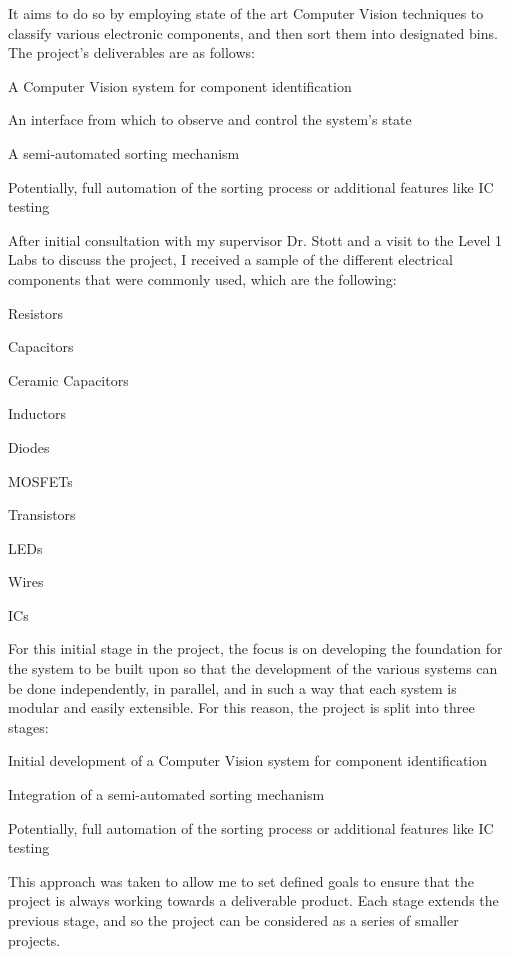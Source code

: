 It aims to do so by employing state of the art Computer Vision techniques to classify various electronic components,
and then sort them into designated bins. The project's deliverables are as follows:
\begin{mylist}
  \item A Computer Vision system for component identification
  \item An interface from which to observe and control the system's state
  \item A semi-automated sorting mechanism
  \item Potentially, full automation of the sorting process or additional features like IC testing
\end{mylist}
\noindent
After initial consultation with my supervisor Dr. Stott and a visit to the Level 1 Labs to discuss the project, I received a sample
of the different electrical components that were commonly used, which are the following:
\begin{multicols}{2}
  \begin{mylist}
    \item Resistors
    \item Capacitors
    \item Ceramic Capacitors
    \item Inductors
    \item Diodes
    \item MOSFETs
    \item Transistors
    \item LEDs
    \item Wires
    \item ICs
  \end{mylist}
\end{multicols}

\noindent
For this initial stage in the project, the focus is on developing the foundation for the system to be built upon so that
the development of the various systems can be done independently, in parallel, and in such a way that each system
is modular and easily extensible. For this reason, the project is split into three stages:
\begin{mylist}
  \item Initial development of a Computer Vision system for component identification
  \item Integration of a semi-automated sorting mechanism
  \item Potentially, full automation of the sorting process or additional features like IC testing
\end{mylist}
This approach was taken to allow me to set defined goals to ensure that the project is always working towards a deliverable product.
Each stage extends the previous stage, and so the project can be considered as a series of smaller projects. 
